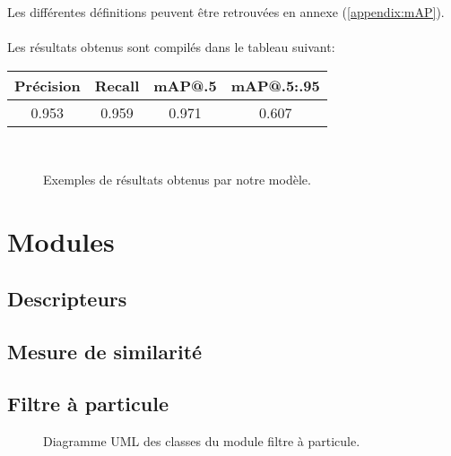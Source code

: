 Les différentes définitions peuvent être retrouvées en annexe (\ref{appendix:mAP}).\\
\\
Les résultats obtenus sont compilés dans le tableau suivant:\\
\begin{center}
\begin{tabular}{|c|c|c|c|}
	\hline
	Précision & Recall & mAP@.5 & mAP@.5:.95\\
	\hline
	0.953 & 0.959 & 0.971 & 0.607\\
	\hline
\end{tabular}
\end{center}

\begin{figure}[!htbp]
\center
	\hspace{0.1cm}
	\\
	\hspace{0.1cm}
\caption{Exemples de résultats obtenus par notre modèle.}
\label{fig:ai_examples}
\end{figure}
\FloatBarrier



\section{Modules}

\subsection{Descripteurs}
\subsection{Mesure de similarité}
\subsection{Filtre à particule}

\begin{figure}[!htbp]
\center
\caption{Diagramme UML des classes du module filtre à particule.}
\label{fig:uml_diagram_particlefilter}
\end{figure}
\FloatBarrier

